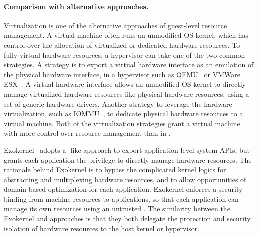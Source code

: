 \paragraph{Comparison with alternative approaches.}
Virtualization is one of the alternative approaches of guest-level resource management. %
A virtual machine often runs an unmodified OS kernel,
which has control over the allocation of virtualized or dedicated hardware resources.
To fully virtual hardware resources,
a hypervisor can take one of the two common strategies.
A strategy
is to export a virtual hardware interface
as an emulation of the physical hardware interface,
in a hypervisor
such as QEMU~\cite{qemu} or VMWare ESX~\cite{wldspurger02vmware-esx}.
A virtual hardware interface
allows an unmodified OS kernel to
directly manage virtualized hardware resources like physical hardware resources,
using a set of generic hardware drivers.
Another strategy to leverage the hardware virtualization,
such as IOMMU~\cite{VT-d},
to dedicate physical hardware resources
to a virtual machine.
Both of the virtualization strategies grant a virtual machine with more control over resource management %
than \thelibos{} in \graphene{}.




Exokernel~\cite{engler95exokernel} adopts a \libos{}-like approach
to export application-level system APIs, but grants each application the privilege to directly manage hardware resources. 
The rationale behind Exokernel is to bypass the complicated kernel logics
for abstracting and multiplexing hardware resources,
and to allow opportunities of domain-based optimization for each application.
Exokernel enforces a security binding from machine resources to applications,
so that each application can
manage its own resources using an untrusted \libos{}.
The similarity between the Exokernel and \graphene{} approaches is that
they both delegate the protection and security isolation of hardware resources to the host kernel or hypervisor.



